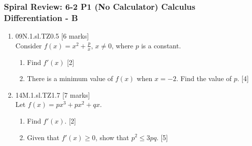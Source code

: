 \documentclass[12pt, twoside]{article}
\begin{document}
 \subsubsection*{Spiral Review: 6-2 P1 (No Calculator) Calculus Differentiation - B}
    \begin{enumerate}

      \item 09N.1.sl.TZ0.5 \hfill [6 marks]\\
      Consider $f(x)= x^2+\frac{p}{x}$, $x \neq 0$, where $p$ is a constant.
      \begin{enumerate}
        \item Find $f'(x)$ \hfill [2]
        \item There is a minimum value of $f(x)$ when $x=-2$. Find the value of $p$. \hfill [4]
      \end{enumerate} \vspace{2cm}

      \item 14M.1.sl.TZ1.7 \hfill [7 marks]\\
      Let $f(x)= px^3 + px^2 + qx$.
      \begin{enumerate}
        \item Find $f'(x)$. \hfill [2]
        \item Given that $f'(x) \geq 0$, show that $p^2 \leq 3pq$. \hfill [5]
      \end{enumerate}

   \end{enumerate}
\end{document}

